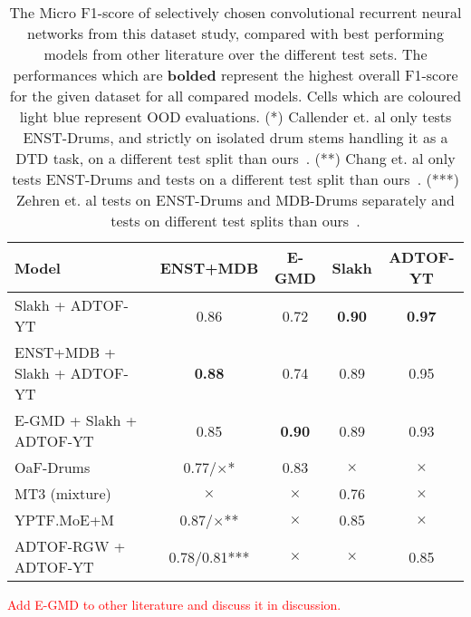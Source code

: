 \begin{table}[H]
    \centering
    \hspace*{-0.6cm}
    \begin{tabular}{l|cccc}
        Model & ENST+MDB & E-GMD & Slakh & ADTOF-YT      \\
        \hline
        Slakh + ADTOF-YT & \cellcolor{blue!10} 0.86	& \cellcolor{blue!10} 0.72 & \textbf{0.90}	& \textbf{0.97} \\
        ENST+MDB + Slakh + ADTOF-YT & \textbf{0.88}	& 0.74 & \cellcolor{blue!10} 0.89	& 0.95 \\
        E-GMD + Slakh + ADTOF-YT & \cellcolor{blue!10} 0.85 & \textbf{0.90} & 0.89 & 0.93 \\
        \hline
        OaF-Drums~\cite{callender2020improvingperceptualqualitydrum} & \cellcolor{blue!10} 0.77/$\times$* & 0.83 & $\times$ & $\times$ \\
        \hline
        MT3 (mixture)~\cite{gardner2022mt3multitaskmultitrackmusic} & $\times$ & $\times$ & 0.76 & $\times$ \\
        \hline
        YPTF.MoE+M~\cite{chang2024yourmt3+} & 0.87/$\times$** & $\times$ & 0.85 & $\times$ \\
        \hline
        ADTOF-RGW + ADTOF-YT~\cite{signals4040042} & \cellcolor{blue!10}0.78/0.81*** & $\times$ & $\times$ & 0.85 \\
    \end{tabular}
    \caption{The Micro F1-score of selectively chosen convolutional recurrent neural networks from this dataset study, compared with best performing models from other literature over the different test sets. The performances which are \textbf{bolded} represent the highest overall F1-score for the given dataset for all compared models. Cells which are \colorbox{blue!10}{coloured light blue} represent \gls{OOD} evaluations.
    (*) Callender et. al only tests ENST-Drums, and strictly on isolated drum stems handling it as a \gls{DTD} task, on a different test split than ours~\cite{callender2020improvingperceptualqualitydrum}.
    (**) Chang et. al only tests ENST-Drums and tests on a different test split than ours~\cite{chang2024yourmt3+}.
    (***) Zehren et. al tests on ENST-Drums and MDB-Drums separately and tests on different test splits than ours~\cite{signals4040042}.
    }
    \label{DatasetComparisonTable}
\end{table}

\textcolor{red}{Add E-GMD to other literature and discuss it in discussion.}

